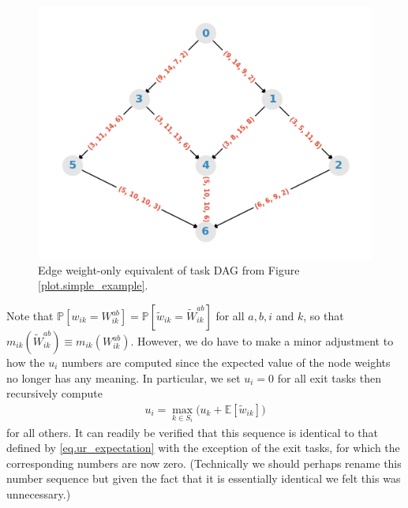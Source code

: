 \documentclass[12pt]{article}
\def\P{\mathbb{P}}
\def\E{\mathbb{E}}
\begin{document}
\begin{figure}
  \centering	
  \includegraphics[scale=0.8]{simple_graph_edge_only.png}
  \caption{Edge weight-only equivalent of task DAG from Figure \ref{plot.simple_example}.}	
  \label{plot.example_edge_only}
\end{figure} 


Note that $\P[w_{ik} = W_{ik}^{ab}] = \P[\tilde{w}_{ik} = \tilde{W}_{ik}^{ab}]$ for all $a, b, i$ and $k$, so that $m_{ik}(\tilde{W}_{ik}^{ab}) \equiv m_{ik}(W_{ik}^{ab})$. However, we do have to make a minor adjustment to how the $u_i$ numbers are computed since the expected value of the node weights no longer has any meaning. In particular, we set $u_i = 0$ for all exit tasks then recursively compute       
\begin{align}
u_i = \max_{k \in S_i} \big( u_k + \E[\tilde{w}_{ik}] \big) \label{eq.ur_edge_only}
\end{align}
for all others. It can readily be verified that this sequence is identical to that defined by \eqref{eq.ur_expectation} with the exception of the exit tasks, for which the corresponding numbers are now zero. (Technically we should perhaps rename this number sequence but given the fact that it is essentially identical we felt this was unnecessary.) 
\end{document}

